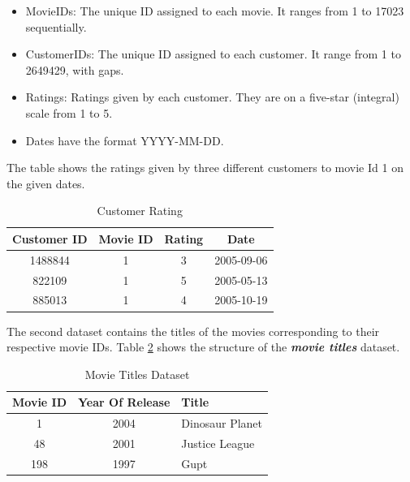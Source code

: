 \documentclass[a4paper,10pt]{article}
\begin{document}
\begin{itemize}
  \item MovieIDs: The unique ID assigned to each movie. It ranges from 1 to 17023 sequentially.
  \item CustomerIDs: The unique ID assigned to each customer. It range from 1 to 2649429, with gaps.
  \item Ratings: Ratings given by each customer. They are on a five-star (integral) scale from 1 to 5.
  \item Dates have the format YYYY-MM-DD.
\end{itemize}
The table shows the ratings given by three different customers to movie Id 1 on the given dates. 






\begin{table}
    \center 
    
    \begin{tabular}{|c|c|c|c|} \hline 
         Customer ID&  Movie ID&  Rating& Date\\ \hline 
         1488844&  1&  3& 2005-09-06
\\ \hline 
         822109&  1&  5& 2005-05-13
\\ \hline 
         885013&  1&  4& 2005-10-19
\\ \hline
    \end{tabular}
    \caption{Customer Rating}   
    \label{Data_1} 
\end{table}

The second dataset contains the titles of the movies corresponding to their respective movie IDs. Table \ref{Movie_titles} shows the structure of the \textit{\textbf{movie titles}} dataset. 

\begin{table}
    \centering
    \begin{tabular}{|c|c|l|} \hline 
         Movie ID& Year Of Release&Title\\ \hline 
         1& 2004&Dinosaur Planet\\ \hline 
         48&  2001&Justice League\\ \hline 
         198
&  1997&Gupt\\ \hline
    \end{tabular}
    \caption{Movie Titles Dataset}
    \label{Movie_titles}
\end{table}
\end{document}
